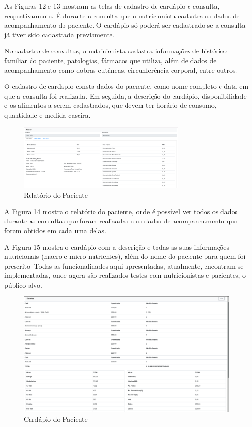 \documentclass[
	12pt,				%
    oneside,			%
	a4paper,			%
	english,			%
	french,				%
	spanish,			%
	brazil,				%
	]{abntex2}
\begin{document}
As Figuras 12 e 13 mostram as telas de cadastro de cardápio e consulta,
respectivamente. É durante a consulta que o nutricionista cadastra os dados de
acompanhamento do paciente. O cardápio só poderá ser cadastrado se a consulta já
tiver sido cadastrada previamente.

No cadastro de consultas, o nutricionista cadastra informações de histórico
familiar do paciente, patologias, fármacos que utiliza, além de dados de
acompanhamento como dobras cutâneas, circunferência corporal, entre outros.

O cadastro de cardápio consta dados do paciente, como nome completo e data
em que a consulta foi realizada. Em seguida, a descrição do cardápio, disponibilidade
e os alimentos a serem cadastrados, que devem ter horário de consumo, quantidade
e medida caseira.

\begin{figure} [hbt]
\label{relatPac} 
\caption{Relatório do Paciente}
\begin{center}
\includegraphics[width=0.75\textwidth]{relatPac1.png}
\end{center}
\end{figure}

A Figura 14 mostra o relatório do paciente, onde é possível ver todos os dados
durante as consultas que foram realizadas e os dados de acompanhamento que foram
obtidos em cada uma delas.

A Figura 15 mostra o cardápio com a descrição e todas as suas informações
nutricionais (macro e micro nutrientes), além do nome do paciente para quem foi
prescrito.
Todas as funcionalidades aqui apresentadas, atualmente, encontram-se
implementadas, onde agora são realizados testes com nutricionistas e pacientes, o público-alvo.

\begin{figure} [hbt]
\label{cardPac} 
\caption{Cardápio do Paciente}
\begin{center}
\includegraphics[width=1.0\textwidth]{cardPac1.png}
\end{center}
\end{figure}
\end{document}
